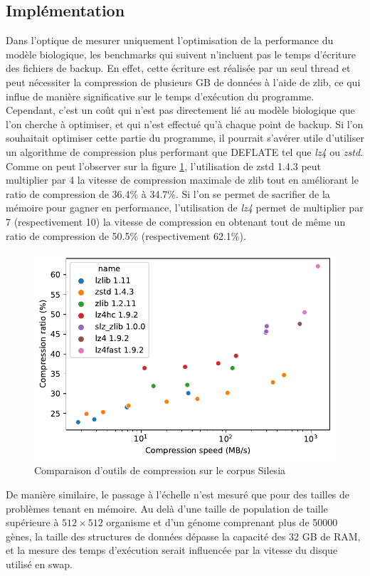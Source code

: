 \documentclass[a4paper, 10pt, twoside]{article}
\begin{document}
\subsection{Implémentation}

Dans l'optique de mesurer uniquement l'optimisation de la performance du modèle biologique, les benchmarks qui suivent n'incluent pas le temps d'écriture des fichiers de backup. En effet, cette écriture est réalisée par un seul thread et peut nécessiter la compression de plusieurs GB de données à l'aide de zlib, ce qui influe de manière significative sur le temps d'exécution du programme. Cependant, c'est un coût qui n'est pas directement lié au modèle biologique que l'on cherche à optimiser, et qui n'est effectué qu'à chaque point de backup. Si l'on souhaitait optimiser cette partie du programme, il pourrait s'avérer utile d'utiliser un algorithme de compression plus performant que DEFLATE tel que \textit{lz4} ou \textit{zstd}. Comme on peut l'observer sur la figure \ref{fig:compression/tools}, l'utilisation de zstd 1.4.3 peut multiplier par 4 la vitesse de compression maximale de zlib tout en améliorant le ratio de compression de 36.4\% à 34.7\%. Si l'on se permet de sacrifier de la mémoire pour gagner en performance, l'utilisation de \textit{lz4} permet de multiplier par 7 (respectivement 10) la vitesse de compression en obtenant tout de même un ratio de compression de 50.5\% (respectivement 62.1\%).

\begin{figure}[htb]
	\centering
	\includegraphics[width=0.5\linewidth]{img/compression_tools.pdf}
	\caption{Comparaison d'outils de compression sur le corpus Silesia \cite{lzbench}}
	\label{fig:compression/tools}
\end{figure}

De manière similaire, le passage à l'échelle n'est mesuré que pour des tailles de problèmes tenant en mémoire. Au delà d'une taille de population de taille supérieure à $512 \times 512$ organisme et d'un génome comprenant plus de 50000 gènes, la taille des structures de données dépasse la capacité des 32 GB de RAM, et la mesure des temps d'exécution serait influencée par la vitesse du disque utilisé en swap.
\end{document}
